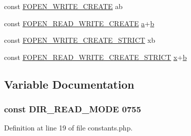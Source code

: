 \begin{DoxyCompactItemize}
\item 
const \hyperlink{constants_8php_a7c5689a170bbaab4dd9c6f3a76bd7a0d}{F\+O\+P\+E\+N\+\_\+\+W\+R\+I\+T\+E\+\_\+\+C\+R\+E\+A\+TE} \textquotesingle{}ab\textquotesingle{}
\item 
const \hyperlink{constants_8php_adcd04289bf4dc262b7652cb4c1eb08f7}{F\+O\+P\+E\+N\+\_\+\+R\+E\+A\+D\+\_\+\+W\+R\+I\+T\+E\+\_\+\+C\+R\+E\+A\+TE} \textquotesingle{}\hyperlink{_chart_8min_8js_aef3b685c08bc6c76c8e729bd0e93901d}{a}+\hyperlink{bootstrap_8min_8js_a398bb8542498d1b14178b02b99df309b}{b}\textquotesingle{}
\item 
const \hyperlink{constants_8php_a02007ca17f39af174ac54d30f2ca7e82}{F\+O\+P\+E\+N\+\_\+\+W\+R\+I\+T\+E\+\_\+\+C\+R\+E\+A\+T\+E\+\_\+\+S\+T\+R\+I\+CT} \textquotesingle{}xb\textquotesingle{}
\item 
const \hyperlink{constants_8php_a2eeb98a015d74560e9b60ec60d7531d4}{F\+O\+P\+E\+N\+\_\+\+R\+E\+A\+D\+\_\+\+W\+R\+I\+T\+E\+\_\+\+C\+R\+E\+A\+T\+E\+\_\+\+S\+T\+R\+I\+CT} \textquotesingle{}\hyperlink{_chart_8min_8js_a81e910173af87b1161e719a504d52407}{x}+\hyperlink{bootstrap_8min_8js_a398bb8542498d1b14178b02b99df309b}{b}\textquotesingle{}
\end{DoxyCompactItemize}


\subsection{Variable Documentation}
\subsubsection[{\texorpdfstring{D\+I\+R\+\_\+\+R\+E\+A\+D\+\_\+\+M\+O\+DE}{DIR_READ_MODE}}]{\setlength{\rightskip}{0pt plus 5cm}const D\+I\+R\+\_\+\+R\+E\+A\+D\+\_\+\+M\+O\+DE 0755}\hypertarget{constants_8php_a5eb43292f0c56482a7869db8adb1c91d}{}\label{constants_8php_a5eb43292f0c56482a7869db8adb1c91d}


Definition at line 19 of file constants.\+php.

